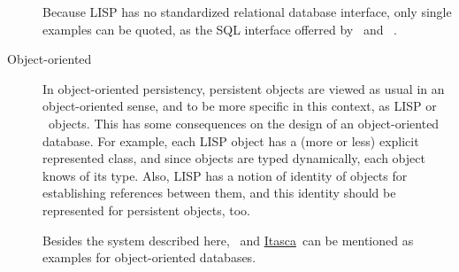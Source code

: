 \begin{description}
  Because LISP has no standardized relational database interface, only
  single examples can be quoted, as the SQL interface offerred by \lw\ 
  and \allegro\ \cl.

\item[Object-oriented] In object-oriented persistency,
  persistent objects are viewed
  as usual in an object-oriented sense, and to be more specific in
  this context, as LISP or \clos\ objects. This has some consequences
  on the design of an object-oriented database. For example, each LISP
  object has a (more or less) explicit represented class, and since
  objects are typed dynamically, each object knows of its type. Also,
  LISP has a notion of identity of objects for establishing references
  between them, and this identity should be represented for persistent
  objects, too.

  Besides the system described here,
  \href{http://www.franz.com/products/allegrostore.html}{\allegro{}{\sc
      Store}}\ and \href{http://www.ibex.ch/}{Itasca}\ can be
  mentioned as examples for object-oriented databases.

\end{description}

